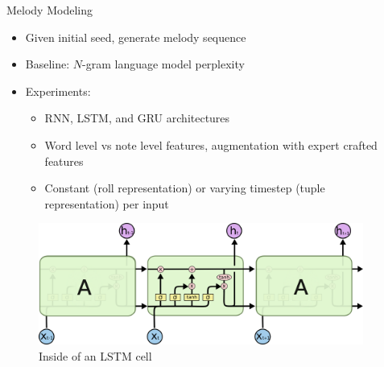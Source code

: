 \documentclass[final]{beamer}
\newlength{\onecolwid}
\newlength{\twocolwid}
\begin{document}
\begin{frame}[t]
\begin{columns}[t]
\begin{column}{\twocolwid}
\begin{columns}[t,totalwidth=\twocolwid]
\begin{column}{\onecolwid}

\begin{block}{Melody Modeling}
  \begin{itemize}
    \item Given initial seed, generate melody sequence
    \item Baseline: $N$-gram language model perplexity
    \item Experiments:
      \begin{itemize}
        \item RNN, LSTM, and GRU architectures
        \item Word level vs note level features, augmentation with expert crafted features
        \item Constant (roll representation) or varying timestep (tuple representation) per input
      \end{itemize}
  \end{itemize}
\end{block}

\begin{figure}
  \includegraphics[width=0.8\linewidth]{LSTM3-chain.png}
  \caption{Inside of an LSTM cell\cite{DBLP:conf/asru/2013}}
\end{figure}


\end{column} %

\begin{column}{\onecolwid}\vspace{-.6in} %



\end{column}
\end{columns}
\end{column}
\end{columns}
\end{frame}
\end{document}
